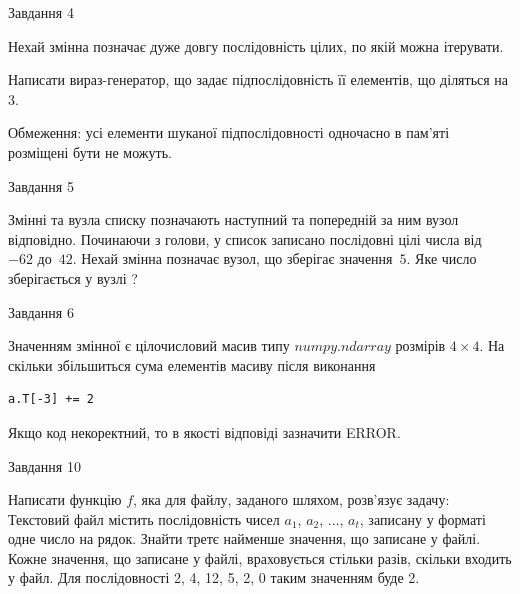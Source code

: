 \documentclass[12pt, ukrainian]{article}
\begin{document}
{\begin{minipage}[t]{8.0cm}
\end{minipage}


               
{\begin{center}Завдання {4}\end{center}}
\vspace{-4mm}
Нехай змінна  позначає дуже довгу послідовність цілих, по якій можна ітерувати.

Написати вираз-генератор, що задає підпослідовність її елементів, що діляться на 3.

Обмеження: усі елементи шуканої підпослідовності одночасно в пам'яті розміщені бути не можуть.\par

\vspace{10mm}
               
{\begin{center}Завдання {5}\end{center}}
\vspace{-4mm}
Змінні  та  вузла списку позначають наступний та попередній за ним вузол відповідно. Починаючи з голови, у список записано послідовні цілі числа від~$-62$ до~$42$. Нехай змінна  позначає вузол, що зберігає значення~$5$.
Яке число зберігається у вузлі  ?\par

               
{\begin{center}Завдання {6}\end{center}}
\vspace{-4mm}
Значенням змінної  є цілочисловий масив типу $numpy.ndarray$ розмірів $4{\times}4$. На скільки збільшиться сума елементів масиву  після виконання
\begin{verbatim}
a.T[-3] += 2
\end{verbatim}


Якщо код некоректний, то в якості відповіді зазначити ERROR.\par

               
{\begin{center}Завдання {10}\end{center}}
\vspace{-4mm}

Написати функцію $f$, яка для файлу, заданого шляхом, розв’язує задачу:\\ Текстовий файл містить послідовність чисел $a_1$, $a_2$, $\ldots$, $a_t$, записану у форматі одне число на рядок. Знайти третє найменше значення, що записане у файлі. Кожне значення, що записане у файлі, враховується стільки разів, скільки входить у файл. Для послідовності 2, 4, 12, 5, 2, 0 таким значенням буде 2.

}
\end{document}
